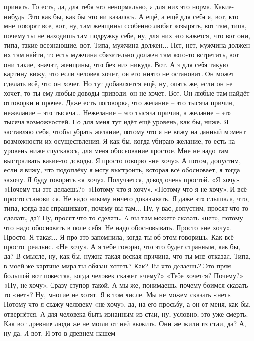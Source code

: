 принять. То есть, да, для тебя
это ненормально, а для них это норма.
Какие-нибудь.
Это как бы, как бы это ни казалось. А ещё,
а ещё для себя я,
вот, кто мне говорят все,
вот, ну, там женщины особенно любят
козырять, вот там,
типа,
почему ты не находишь там подружку себе,
ну, для них это кажется, что вот
они, типа, такие всезнающие, вот.
Типа, мужчина должен...
Нет, нет, мужчина должен
их там найти, то есть
мужчина обязательно должен
там кого-то встретить, вот они
такие, значит, женщины,
что без них никуда. Вот.
А я для
себя
такую картину вижу, что
если человек хочет, он
его ничто не остановит. Он может
сделать всё, что он хочет.
Но тут добавляется ещё, ну, опять же,
если он не хочет, то ты ему любые
доводы приводи, он не
хочет. Вот. Он любые
там найдёт отговорки и прочее.
Даже есть поговорка, что
желание – это тысяча причин,
нежелание – это тысяча...
Нежелание – это тысяча причин,
а желание – это тысяча возможностей.
Но для меня тут идёт ещё
уровень, как бы, ниже.
Я заставляю себя,
чтобы убрать
желание,
потому что
я не вижу
на данный момент возможности
их осуществления.
Я как бы, когда убираю желание,
то есть на уровень ниже спускаюсь,
для меня обоснование простое.
Мне не надо там выстраивать какие-то
доводы. Я просто говорю «не хочу».
А потом, допустим,
если я вижу, что подоплёку
я могу выстроить, которая
всё обосновает, я тогда захочу.
Я буду говорить «я хочу».
Получается, довод очень простой.
«Я хочу». «Почему ты это делаешь?»
«Потому что я хочу». «Потому что я не хочу».
И всё просто становится.
Не надо
никому ничего доказывать.
Я даже это слышала, что, типа, когда вас спрашивают,
почему вы там... Ну, у вас, допустим, просят что-то сделать, да?
Ну, просят что-то сделать.
А вы там можете сказать «нет»,
потому что надо обосновать в поле себя.
Не надо обосновывать. Просто «не хочу».
Просто.
Я такая... Я про это запомнила,
когда ты об этом говоришь.
Как всё просто, реально.
«Не хочу». А я тебе говорю, что это будет странным,
как бы, да? В смысле,
ну, как бы, нужна такая веская
причина, что ты мне отказал.
Типа, в моей же картине
мира ты обязан хотеть?
Как? Ты что делаешь?
Это прям большой вот
повестка, когда человек скажет «чему?»
«Тебе хочется? Почему?» «Ну, не хочу».
Сразу ступор такой.
А мы же, понимаешь, почему боимся
сказать-то «нет»? Ну, многие
не хотят. Я в том числе.
Мы не можем сказать «нет».
Потому что я скажу человеку
«не хочу», да, на его просьбу,
а он от меня, как бы, отвернётся.
А для человека быть изнанным из стаи,
ну, условно, это уже смерть.
Как вот древние люди же не могли от ней выжить.
Они же жили из стаи, да?
А, ну да. И вот. И это в древнем нашем
